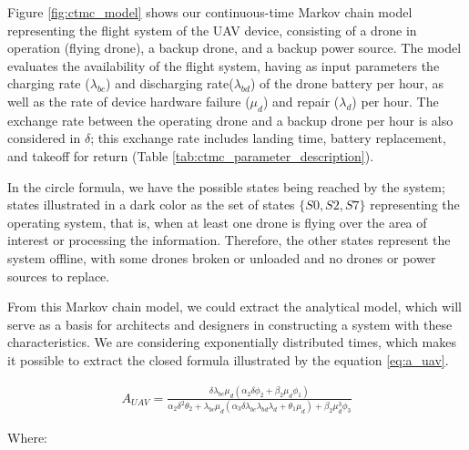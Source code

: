 \documentclass[conference]{IEEEtran}
\begin{document}
Figure \ref{fig:ctmc_model} shows our continuous-time Markov chain model representing the flight system of the UAV device, consisting of a drone in operation (flying drone), a backup drone, and a backup power source. The model evaluates the availability of the flight system, having as input parameters the charging rate ($\lambda_{bc}$) and discharging rate($\lambda_{bd}$) of the drone battery per hour, as well as the rate of device hardware failure ($\mu_{d}$) and repair ($\lambda_{d}$) per hour. The exchange rate between the operating drone and a backup drone per hour is also considered in $\delta$; this exchange rate includes landing time, battery replacement, and takeoff for return (Table \ref{tab:ctmc_parameter_description}).

In the circle formula, we have the possible states being reached by the system; states illustrated in a dark color as the set of states $\{S0, S2, S7\}$ representing the operating system, that is, when at least one drone is flying over the area of interest or processing the information. Therefore, the other states represent the system offline, with some drones broken or unloaded and no drones or power sources to replace.

From this Markov chain model, we could extract the analytical model, which will serve as a basis for architects and designers in constructing a system with these characteristics. We are considering exponentially distributed times, which makes it possible to extract the closed formula illustrated by the equation \ref{eq:a_uav}.

\begin{align}\label{eq:a_uav}
A_{UAV} = \frac{\delta  \lambda_{bc} \mu_{d} (\alpha_{2} \delta \phi_{2} + \beta_{2} \mu_{d} \phi_{1})}{ \alpha_{2} \delta^{2} \theta_{2} + \lambda_{bc} \mu_{d} (\alpha_{3} \delta  \lambda_{bc} \lambda_{bd} \lambda_{d} + \theta_{1} \mu_{d})+ \beta_{2} \mu_{d}^{3} \phi_{3}}
\end{align}

Where: \\
\end{document}
